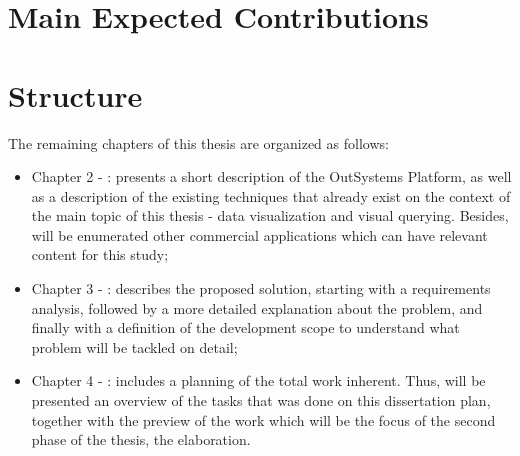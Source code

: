 \section{Main Expected Contributions}
\label{sec:main_exp_contributions}

\section{Structure}
\label{sec:structure}

The remaining chapters of this thesis are organized as follows:

\begin{itemize}
  \item Chapter 2 - : presents a short description
  of the OutSystems Platform, as well as a description of the existing techniques
  that already exist on the context of the main topic of this thesis - data visualization
  and visual querying. Besides, will be enumerated other commercial applications
  which can have relevant content for this study;
  \item Chapter 3 - : describes the proposed solution,
  starting with a requirements analysis, followed by a more detailed explanation
  about the problem, and finally with a definition of the development scope to
  understand what problem will be tackled on detail;
  \item Chapter 4 - : includes a planning
  of the total work inherent. Thus, will be presented an overview of the tasks that
  was done on this dissertation plan, together with the preview of the work which
  will be the focus of the second phase of the thesis, the elaboration.
\end{itemize}
